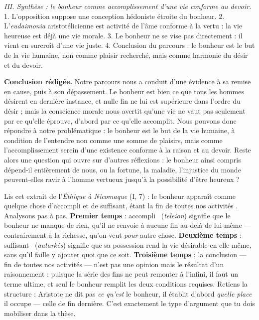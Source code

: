 \documentclass[11pt]{article}
\begin{document}
\begin{exoresolu}
\emph{III. Synthèse : le bonheur comme accomplissement d'une vie conforme au devoir.}
1. L'opposition suppose une conception hédoniste étroite du bonheur. 2. L'\emph{eudaimonia} aristotélicienne est activité de l'âme conforme à la vertu : la vie heureuse est déjà une vie morale. 3. Le bonheur ne se vise pas directement : il vient en surcroît d'une vie juste. 4. Conclusion du parcours : le bonheur est le but de la vie humaine, non comme plaisir recherché, mais comme harmonie du désir et du devoir.

\textbf{Conclusion rédigée.} Notre parcours nous a conduit d'une évidence à sa remise en cause, puis à son dépassement. Le bonheur est bien ce que tous les hommes désirent en dernière instance, et nulle fin ne lui est supérieure dans l'ordre du désir ; mais la conscience morale nous avertit qu'une vie ne vaut pas seulement par ce qu'elle éprouve, d'abord par ce qu'elle accomplit. Nous pouvons donc répondre à notre problématique : le bonheur est le but de la vie humaine, à condition de l'entendre non comme une somme de plaisirs, mais comme l'accomplissement serein d'une existence conforme à la raison et au devoir. Reste alors une question qui ouvre sur d'autres réflexions : le bonheur ainsi compris dépend-il entièrement de nous, ou la fortune, la maladie, l'injustice du monde peuvent-elles ravir à l'homme vertueux jusqu'à la possibilité d'être heureux ?
\end{exoresolu}

\begin{experience}
Lis cet extrait de l'\emph{Éthique à Nicomaque} (I, 7) : \guillemotleft le bonheur apparaît comme quelque chose d'accompli et de suffisant, étant la fin de toutes nos activités \guillemotright. Analysons pas à pas. \textbf{Premier temps} : \guillemotleft accompli \guillemotright\ (\emph{teleion}) signifie que le bonheur ne manque de rien, qu'il ne renvoie à aucune fin au-delà de lui-même — contrairement à la richesse, qu'on veut \emph{pour} autre chose. \textbf{Deuxième temps} : \guillemotleft suffisant \guillemotright\ (\emph{autarkès}) signifie que sa possession rend la vie désirable en elle-même, sans qu'il faille y ajouter quoi que ce soit. \textbf{Troisième temps} : la conclusion — \guillemotleft fin de toutes nos activités \guillemotright — n'est pas une opinion mais le résultat d'un raisonnement : puisque la série des fins ne peut remonter à l'infini, il faut un terme ultime, et seul le bonheur remplit les deux conditions requises. Retiens la structure : Aristote ne dit pas \emph{ce qu'est} le bonheur, il établit d'abord \emph{quelle place} il occupe — celle de fin dernière. C'est exactement le type d'argument que tu dois mobiliser dans la thèse.
\end{experience}
\end{document}
